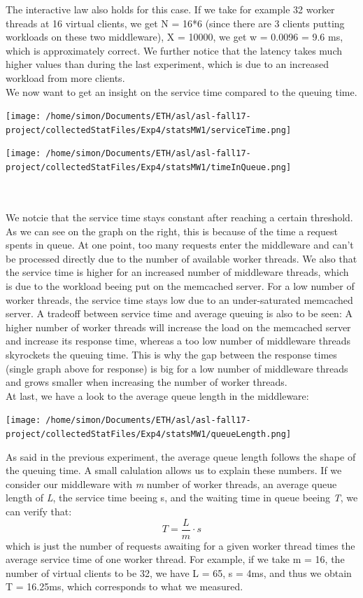 \documentclass[11pt,a4paper]{article}
\begin{document}
The interactive law also holds for this case. If we take for example 32 worker threads at 16 virtual clients, we get N = 16*6 (since there are 3 clients putting workloads on these two middleware), X = 10000, we get w = 0.0096 = 9.6 ms, which is approximately correct. 
We further notice that the latency takes much higher values than during the last experiment, which is due to an increased workload from more clients. 
\\
We now want to get an insight on the service time compared to the queuing time.
\\
\begin{minipage}{0.5\linewidth}
\texttt{[image: /home/simon/Documents/ETH/asl/asl-fall17-project/collectedStatFiles/Exp4/statsMW1/serviceTime.png]}
\end{minipage}
\hfill
\begin{minipage}{0.5\linewidth}
\texttt{[image: /home/simon/Documents/ETH/asl/asl-fall17-project/collectedStatFiles/Exp4/statsMW1/timeInQueue.png]}
\end{minipage}
\\\\
We notcie that the service time stays constant after reaching a certain threshold. As we can see on the graph on the right, this is because of the time a request spents in queue. At one point, too many requests enter the middleware and can't be processed directly due to the number of available worker threads. We also that the service time is higher for an increased number of middleware threads, which is due to the workload beeing put on the memcached server. For a low number of worker threads, the service time stays low due to an under-saturated memcached server. 
A tradeoff between service time and average queuing is also to be seen: A higher number of worker threads will increase the load on the memcached server and increase its response time, whereas a too low number of middleware threads skyrockets the queuing time. This is why the gap between the response times (single graph above for response) is big for a low number of middleware threads and grows smaller when increasing the number of worker threads. 
\\
At last, we have a look to the average queue length in the middleware:
\begin{center}
\texttt{[image: /home/simon/Documents/ETH/asl/asl-fall17-project/collectedStatFiles/Exp4/statsMW1/queueLength.png]}
\end{center}
As said in the previous experiment, the average queue length follows the shape of the queuing time. A small calulation allows us to explain these numbers. 
If we consider our middleware with \textit{m} number of worker threads, an average queue length of \textit{L}, the service time beeing {s}, and the waiting time in queue beeing \textit{T}, we can verify that: 
\[ T = \frac{L}{m}\cdot s \]
which is just the number of requests awaiting for a given worker thread times the average service time of one worker thread. For example, if we take m = 16, the number of virtual clients to be 32, we have L = 65, s = 4ms, and thus we obtain T = 16.25ms, which corresponds to what we measured. 
\end{document}
